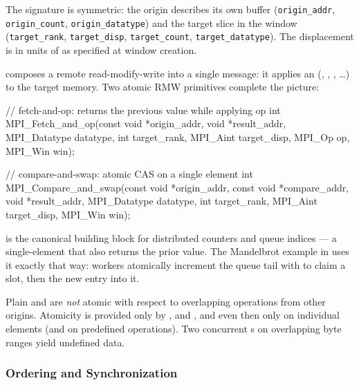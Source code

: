The signature is symmetric: the origin describes its own buffer (\texttt{origin\_addr}, \texttt{origin\_count}, \texttt{origin\_datatype}) and the target slice in the window (\texttt{target\_rank}, \texttt{target\_disp}, \texttt{target\_count}, \texttt{target\_datatype}). The displacement is in units of  as specified at window creation.

 composes a remote read-modify-write into a single message: it applies an  (, , , \dots) to the target memory. Two atomic RMW primitives complete the picture:

\begin{codeblock}[language=C]
// fetch-and-op: returns the previous value while applying op
int MPI_Fetch_and_op(const void *origin_addr, void *result_addr,
                     MPI_Datatype datatype, int target_rank,
                     MPI_Aint target_disp, MPI_Op op, MPI_Win win);

// compare-and-swap: atomic CAS on a single element
int MPI_Compare_and_swap(const void *origin_addr, const void *compare_addr,
                         void *result_addr, MPI_Datatype datatype,
                         int target_rank, MPI_Aint target_disp, MPI_Win win);
\end{codeblock}

 is the canonical building block for distributed counters and queue indices --- a single-element  that also returns the prior value. The Mandelbrot example in  uses it exactly that way: workers atomically increment the queue tail with  to claim a slot, then  the new entry into it.

\begin{warningblock}
    Plain  and  are \emph{not} atomic with respect to overlapping operations from other origins. Atomicity is provided only by ,  and , and even then only on individual elements (and on predefined operations). Two concurrent s on overlapping byte ranges yield undefined data.
\end{warningblock}

\subsubsection{Ordering and Synchronization}
\label{sec:rma-sync}

